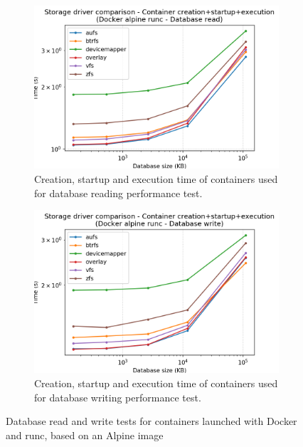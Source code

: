 \begin{figure}[h!]
    \begin{subfigure}{.5\textwidth}
      \centering
      \includegraphics[width=\linewidth]{images/storage-driver/storage-driver-full-Docker-alpine-runc---Database-read.png}
      \caption{Creation, startup and execution time of containers used for database reading performance test.}
      \label{fig:storage-driver:db-read-full}
    \end{subfigure}
    \begin{subfigure}{.5\textwidth}
      \centering
      \includegraphics[width=\linewidth]{images/storage-driver/storage-driver-full-Docker-alpine-runc---Database-write.png}
      \caption{Creation, startup and execution time of containers used for database writing performance test.}
      \label{fig:storage-driver:db-write-full}
    \end{subfigure}
    
    \caption{Database read and write tests for containers launched with Docker and runc, based on an Alpine image}
\end{figure}

